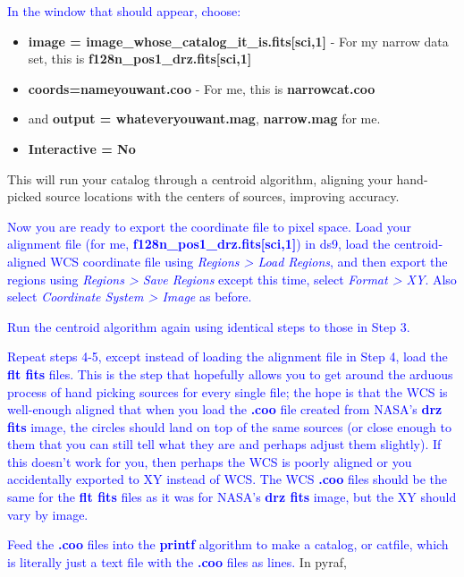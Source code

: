 \documentclass[11pt,obeyspaces]{article} %
\begin{document}
\begin{oframed}
\begin{enumerate}
{\textcolor{blue}{In the window that should appear, choose:}
\begin{itemize}
\item {\bf image = image\_whose\_catalog\_it\_is.fits[sci,1]} - \color{blue} For my narrow data set, this is {\bf f128n\_pos1\_drz.fits[sci,1]} \color{black}
\item {\bf coords=nameyouwant.coo} - \color{blue} For me, this is \color{blue} {\bf narrowcat.coo}\color{black}
\item and {\bf output = whateveryouwant.mag}, \color{blue} {\bf narrow.mag} for me. \color{black} 
\item {\bf Interactive = No}
\end{itemize}
This will run your catalog through a centroid algorithm, aligning your hand-picked source locations with the centers of sources, improving accuracy.
\item \textcolor{blue}{Now you are ready to export the coordinate file to pixel space. Load your alignment file (for me, {\bf f128n\_pos1\_drz.fits[sci,1]}) in ds9, load the centroid-aligned WCS coordinate file using {\it Regions > Load Regions}, and then export the regions using {\it Regions > Save Regions} except this time, select {\it Format > XY}. Also select {\it Coordinate System > Image} as before.}
\item \textcolor{blue}{Run the centroid algorithm again using identical steps to those in Step 3.}
\item \textcolor{blue}{Repeat steps 4-5, except instead of loading the alignment file in Step 4, load the {\bf flt fits} files. This is the step that hopefully allows you to get around the arduous process of hand picking sources for every single file; the hope is that the WCS is well-enough aligned that when you load the {\bf .coo} file created from NASA's {\bf drz fits} image, the circles should land on top of the same sources (or close enough to them that you can still tell what they are and perhaps adjust them slightly). If this doesn't work for you, then perhaps the WCS is poorly aligned or you accidentally exported to XY instead of WCS. The WCS {\bf .coo} files should be the same for the {\bf flt fits} files as it was for NASA's {\bf drz fits} image, but the XY should vary by image.}
\item \textcolor{blue}{Feed the {\bf .coo} files into the {\bf printf} algorithm to make a catalog, or catfile, which is literally just a text file with the {\bf .coo} files as lines.} In pyraf, \\
\\
}
\end{enumerate}
\end{oframed}
\end{document}
